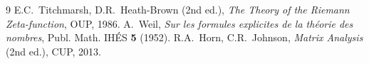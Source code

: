 \documentclass[11pt,a4paper]{proofarticle}
\begin{document}
\begin{thebibliography}{9}
E.C.~Titchmarsh, D.R.~Heath-Brown (2nd ed.), \emph{The Theory of the Riemann Zeta-function}, OUP, 1986.
A.~Weil, \emph{Sur les formules explicites de la théorie des nombres}, Publ. Math. IHÉS \textbf{5} (1952).
R.A.~Horn, C.R.~Johnson, \emph{Matrix Analysis} (2nd ed.), CUP, 2013.
\end{thebibliography}
\end{document}

